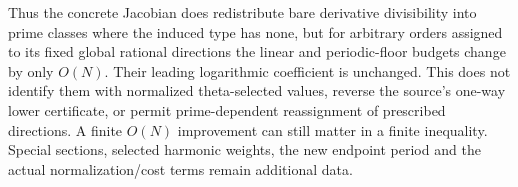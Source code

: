 Thus the concrete Jacobian does redistribute bare derivative divisibility into prime classes where the induced type has none, but for arbitrary orders assigned to its fixed global rational directions the linear and periodic-floor budgets change by only $O(N)$. Their leading logarithmic coefficient is unchanged. This does not identify them with normalized theta-selected values, reverse the source's one-way  lower certificate, or permit prime-dependent reassignment of prescribed directions. A finite $O(N)$ improvement can still matter in a finite inequality. Special sections, selected harmonic weights, the new endpoint period and the actual normalization/cost terms remain additional data.

